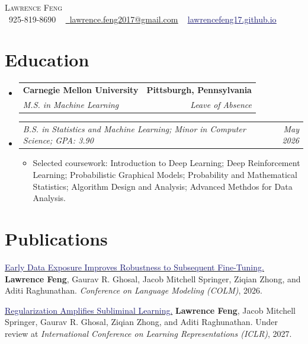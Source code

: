 \documentclass[letterpaper,11pt]{article}
\makeatletter
\newcommand{\resumeItem}[1]{
  \item\small{{#1 \vspace{-2pt}}}
}
\newcommand{\resumeSubheading}[4]{
  \vspace{-2pt}\item
    \begin{tabular*}{1.0\textwidth}[t]{l@{\extracolsep{\fill}}r}
      \textbf{#1} & \textbf{\small #2} \\
      \textit{\small #3} & \textit{\small #4} \\
    \end{tabular*}\vspace{-7pt}
}
\newcommand{\resumeSubSubheading}[2]{
  \item
    \begin{tabular*}{0.97\textwidth}{l@{\extracolsep{\fill}}r}
      \textit{\small #1} & \textit{\small #2} \\
    \end{tabular*}\vspace{-7pt}
}
\newcommand{\resumeSubHeadingListStart}{\begin{itemize}[leftmargin=0.0in, label={}]}
\newcommand{\resumeSubHeadingListEnd}{\end{itemize}}
\newcommand{\resumeItemListStart}{\begin{itemize}}
\newcommand{\resumeItemListEnd}{\end{itemize}\vspace{-5pt}}
\makeatother
\begin{document}
\begin{center}
    {\Huge \scshape Lawrence Feng} \\ \vspace{1pt}
    \small
    \raisebox{-0.1\height}\faPhone\ 925-819-8690 ~
    \href{mailto:lawrence.feng2017@gmail.com}{
      \raisebox{-0.2\height}\faEnvelope\ \underline{lawrence.feng2017@gmail.com}}
    ~
    \href{https://lawrencefeng17.github.io/}{
      \textcolor{MidnightBlue}{\underline{lawrencefeng17.github.io}}}
    \vspace{-8pt}
\end{center}

\section{Education}
\resumeSubHeadingListStart
    \resumeSubheading
        {Carnegie Mellon University}{Pittsburgh, Pennsylvania}
        {M.S. in Machine Learning}{Leave of Absence}
    \resumeSubSubheading
        {B.S. in Statistics and Machine Learning; Minor in Computer Science; GPA: 3.90}{May 2026}
    \resumeItemListStart
        \resumeItem{Selected coursework: Introduction to Deep Learning; Deep Reinforcement Learning; Probabilistic Graphical Models; Probability and Mathematical Statistics; Algorithm Design and Analysis; Advanced Methdos for Data Analysis.}
    \resumeItemListEnd
\resumeSubHeadingListEnd
\vspace{-14pt}

\section{Publications}
{\small
\noindent\href{https://arxiv.org/abs/2605.12705}{\textcolor{MidnightBlue}{Early Data Exposure Improves Robustness to Subsequent Fine-Tuning.}}
\textbf{Lawrence Feng}, Gaurav R. Ghosal, Jacob Mitchell Springer,
Ziqian Zhong, and Aditi Raghunathan.
\textit{Conference on Language Modeling (COLM)}, 2026.\par
\vspace{2pt}
\noindent\href{https://lawrencefeng17.github.io/papers/subliminal/}{\textcolor{MidnightBlue}{Regularization Amplifies Subliminal Learning.}}
\textbf{Lawrence Feng}, Jacob Mitchell Springer, Gaurav R. Ghosal,
Ziqian Zhong, and Aditi Raghunathan.
Under review at \textit{International Conference on Learning Representations (ICLR)}, 2027.\par
}
\vspace{-6pt}
\end{document}
